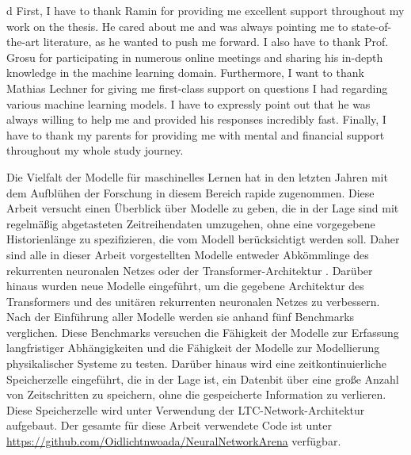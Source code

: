 \documentclass[draft,final]{vutinfth} %
\begin{document}
\frontmatter %


\AddStatementPage


\begin{acknowledgements*}d
First, I have to thank Ramin for providing me excellent support throughout my work on the thesis.
He cared about me and was always pointing me to state-of-the-art literature, as he wanted to push me forward.
I also have to thank Prof. Grosu for participating in numerous online meetings and sharing his in-depth knowledge in the machine learning domain.
Furthermore, I want to thank Mathias Lechner for giving me first-class support on questions I had regarding various machine learning models.
I have to expressly point out that he was always willing to help me and provided his responses incredibly fast.
Finally, I have to thank my parents for providing me with mental and financial support throughout my whole study journey.
\end{acknowledgements*}

\begin{kurzfassung}
Die Vielfalt der Modelle für maschinelles Lernen hat in den letzten Jahren mit dem Aufblühen der Forschung in diesem Bereich rapide zugenommen.
Diese Arbeit versucht einen Überblick über Modelle zu geben, die in der Lage sind mit regelmäßig abgetasteten Zeitreihendaten umzugehen, ohne eine vorgegebene Historienlänge zu spezifizieren, die vom Modell berücksichtigt werden soll.
Daher sind alle in dieser Arbeit vorgestellten Modelle entweder Abkömmlinge des rekurrenten neuronalen Netzes oder der Transformer-Architektur \cite{Transformer}.
Darüber hinaus wurden neue Modelle eingeführt, um die gegebene Architektur des Transformers \cite{Transformer} und des unitären rekurrenten neuronalen Netzes \cite{EfficientUnitaryRNNs} zu verbessern.
Nach der Einführung aller Modelle werden sie anhand fünf Benchmarks verglichen.
Diese Benchmarks versuchen die Fähigkeit der Modelle zur Erfassung langfristiger Abhängigkeiten und die Fähigkeit der Modelle zur Modellierung physikalischer Systeme zu testen.
Darüber hinaus wird eine zeitkontinuierliche Speicherzelle eingeführt, die in der Lage ist, ein Datenbit über eine große Anzahl von Zeitschritten zu speichern, ohne die gespeicherte Information zu verlieren.
Diese Speicherzelle wird unter Verwendung der LTC-Network-Architektur \cite{LTCNetworks} aufgebaut.
Der gesamte für diese Arbeit verwendete Code ist unter \url{https://github.com/Oidlichtnwoada/NeuralNetworkArena} verfügbar.
\end{kurzfassung}
\end{document}

